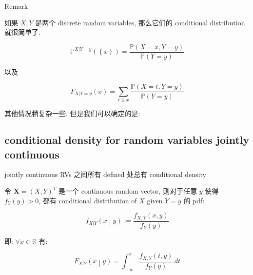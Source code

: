 \documentclass{qlnotes-export}
\begin{document}
\begin{qlremark}{Remark}

如果 \(X,Y\) 是两个 discrete random variables, 那么它们的 conditional distribution 就很简单了.

\[{\mathbb{P}}^{X|Y = y}(\left\{ x \right\}) = \frac{{\mathbb{P}}(X = x,Y = y)}{{\mathbb{P}}(Y = y)}\]

以及

\[F_{X|Y = y}(x) = \sum\limits_{t \leq x}\frac{{\mathbb{P}}(X = t,Y = y)}{{\mathbb{P}}(Y = y)}\]

其他情况稍复杂一些. 但是我们可以确定的是:

\end{qlremark}

\subsection{conditional density for random variables jointly continuous}\label{conditional-density-for-random-variables-jointly-continuous}

\begin{theorem}{jointly continuous RVs 之间所有 defined 处总有 conditional density}\label{thm-03-joint-conditional-distribution-jointly-continuous-rvs-defined-conditional-density}

令 \(\mathbf{X} = (X,Y)^{T}\) 是一个 continuous random vector, 则对于任意 \(y\) 使得 \(f_{Y}(y) > 0\), 都有 conditional distribution of \(X\) given \(Y = y\) 的 pdf:

\[\left. f_{X|Y}(x \middle| y) := \frac{f_{X,Y}(x,y)}{f_{Y}(y)} \right.\]

即: \(\forall x \in {\mathbb{R}}\) 有:

\[\left. F_{X|Y}(x \middle| y) = \int_{- \infty}^{x}\frac{f_{X,Y}(t,y)}{f_{Y}(y)}\, dt \right.\]

\end{theorem}
\end{document}
